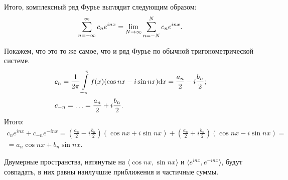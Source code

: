 Итого, комплексный ряд Фурье выглядит следующим образом:
$$
\sum\limits_{n=-\infty}^{\infty} c_n e^{inx}  = \lim\limits_{N \to \infty} \sum\limits_{n=-N}^{N} c_n e^{inx}.
$$

Покажем, что это то же самое, что и ряд Фурье по обычной тригонометрической системе.
\begin{align*}
& c_n = \frac{1}{2\pi}  \int\limits_{-\pi}^{\pi} f(x) (\cos nx - i\sin nx) \mathrm{d} x = \frac{a_n}{2} - i \frac{b_n}{2};\\
& c_{-n} = \ldots = \frac{a_n}{2} + i \frac{b_n}{2}.
\end{align*}
Итого:
\begin{gather*}
c_n e^{inx} + c_{-n} e^{-inx} = \left( \frac{a_n}{2} - i\frac{b_n}{2} \right)(\cos nx + i\sin nx) + \left( \frac{a_n}{2} + i\frac{b_n}{2} \right)(\cos nx - i\sin nx) =\\= a_n \cos nx + b_n \sin nx.
\end{gather*}

Двумерные пространства, натянутые на $\langle \cos nx , \sin nx \rangle$ и $\langle e^{inx}, e^{-inx} \rangle$, будут совпадать, в них равны наилучшие приближения и частичные суммы.

